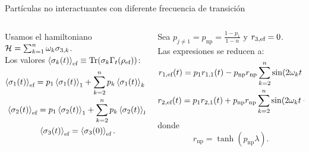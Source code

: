 \begin{frame}{Partículas no interactuantes con diferente frecuencia de transición}
    \begin{columns}
        \begin{column}{0.5\textwidth}
            Usamos el hamiltoniano $\mathcal{H}=\sum_{k=1}^{n}\omega_{k}\sigma_{3,k}$.\\ \pause
            Los valores $\expval{\sigma_{k}(t)}_{\text{ef}}\equiv\Tr(\sigma_{k}\Gamma_{t}(\rho_{\text{ef}}))$:\pause
            \begin{equation}
                \begin{gathered}
                \expval{\pauli{1}(t)}_{\ef}=p_{1} \expval{\sigma_{1}(t)}_{1}+\sum_{k=2}^{n}p_{k}\expval{\pauli{1}(t)}_{k}\text{\footnotemark}\\
                \expval{\pauli{2}(t)}_{\ef}=p_{1} \expval{\sigma_{2}(t)}_{1}+\sum_{k=2}^{n}p_{k}\expval{\pauli{2}(t)}_{k}\\
                \expval{\pauli{3}(t)}_{\ef}=\expval{\pauli{3}(0)}_{\ef}.
            \end{gathered}\nonumber
        \end{equation}
        \end{column}
        \begin{column}{0.5\textwidth}
            Sea $p_{j\neq 1}=p_{\text{np}}=\frac{1-p_{1}}{1-n}$ y $r_{3,\text{ef}}=0$.\\
            Las expresiones se reducen a:
            \begin{equation}
                \begin{gathered}
                    r_{1,\text{ef}}(t)=p_{1}r_{1,1}(t)-p_{\text{np}}r_{\text{np}}\sum_{k=2}^{n}\sin(2\omega_{k} t-\phi)\\
                    r_{2,\text{ef}}(t)=p_{1}r_{2,1}(t)+p_{\text{np}}r_{\text{np}}\sum_{k=2}^{n}\sin(2\omega_{k} t+\theta).
                \end{gathered}\nonumber
            \end{equation}
            donde
            \begin{equation}
                r_{\text{np}}=\tanh(p_{\text{np}} \lambda).\nonumber
            \end{equation}
        \end{column}
    \end{columns}
\end{frame}

